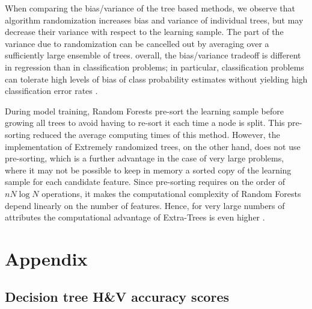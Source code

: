 When comparing the bias/variance of the tree based methods, we observe that algorithm randomization increases bias and variance of individual trees, but  may decrease their variance with respect to the learning sample. The part of the variance due to randomization can be cancelled out by averaging over a
sufficiently large ensemble of trees. overall, the bias/variance tradeoff is different in regression than in classification problems;
in particular, classification problems can tolerate high levels of bias of class probability estimates without yielding high classification error rates \citep{geurts2006extremely}. 

During model training, Random Forests pre-sort the learning sample before growing all trees to avoid having to re-sort it each time a node is split. This pre-sorting reduced the average computing times of this method. However, the implementation of Extremely randomized trees, on the other hand, does not use pre-sorting, which is a further advantage in the case of very large problems, where it may not be possible to keep in memory a sorted copy of the learning sample for each candidate feature. Since pre-sorting requires on the order of $nN\log N$ operations, it makes the
computational complexity of Random Forests depend linearly on the number of features. Hence, for very large numbers of attributes the computational advantage of Extra-Trees is even higher \citep{geurts2006extremely}.


\section{Appendix}
\subsection{Decision tree H\&V accuracy scores}

